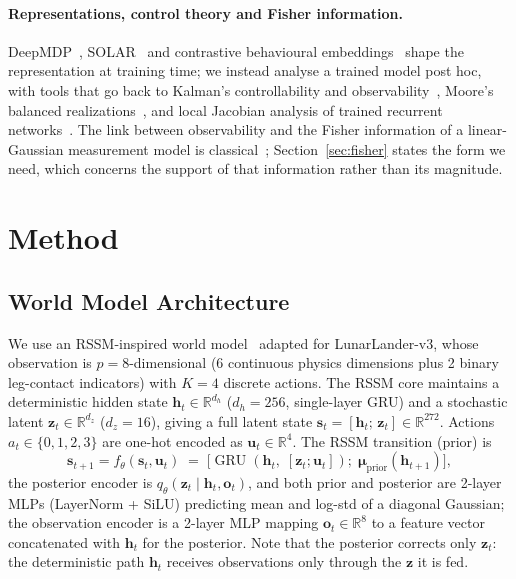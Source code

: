 \documentclass[11pt]{article}
\newcommand{\R}{\mathbb{R}}
\theoremstyle{remark}
\begin{document}
\paragraph{Representations, control theory and Fisher information.}
DeepMDP~\cite{gelada2019deepmdp}, SOLAR~\cite{zhang2019solar} and contrastive behavioural embeddings~\cite{agarwal2021contrastive} shape the representation at training time; we instead analyse a trained model post hoc, with tools that go back to Kalman's controllability and observability~\cite{kalman1963mathematical}, Moore's balanced realizations~\cite{moore1981principal}, and local Jacobian analysis of trained recurrent networks~\cite{sussillo2013opening}. The link between observability and the Fisher information of a linear-Gaussian measurement model is classical~\cite{kay1993fundamentals,anderson1979optimal}; Section~\ref{sec:fisher} states the form we need, which concerns the support of that information rather than its magnitude.

\section{Method}
\label{sec:method}

\subsection{World Model Architecture}
\label{sec:architecture}

We use an RSSM-inspired world model~\cite{hafner2020dreamer,hafner2023dreamerv3} adapted for LunarLander-v3, whose observation is $p{=}8$-dimensional (6 continuous physics dimensions plus 2 binary leg-contact indicators) with $K{=}4$ discrete actions. The RSSM core maintains a deterministic hidden state $\bm{h}_t \in \R^{d_h}$ ($d_h{=}256$, single-layer GRU) and a stochastic latent $\bm{z}_t \in \R^{d_z}$ ($d_z{=}16$), giving a full latent state $\bm{s}_t = [\bm{h}_t;\, \bm{z}_t] \in \R^{272}$. Actions $a_t \in \{0,1,2,3\}$ are one-hot encoded as $\bm{u}_t \in \R^4$. The RSSM transition (prior) is
\begin{equation}
  \bm{s}_{t+1} = f_\theta(\bm{s}_t, \bm{u}_t)
    \;=\;
    \bigl[\operatorname{GRU}(\bm{h}_t,\; [\bm{z}_t;\bm{u}_t]);\;
          \bm{\mu}_{\text{prior}}(\bm{h}_{t+1})\bigr],
  \label{eq:transition}
\end{equation}
the posterior encoder is $q_\theta(\bm{z}_t \mid \bm{h}_t, \bm{o}_t)$, and both prior and posterior are 2-layer MLPs (LayerNorm + SiLU) predicting mean and log-std of a diagonal Gaussian; the observation encoder is a 2-layer MLP mapping $\bm{o}_t \in \R^8$ to a feature vector concatenated with $\bm{h}_t$ for the posterior. Note that the posterior corrects only $\bm{z}_t$: the deterministic path $\bm{h}_t$ receives observations only through the $\bm{z}$ it is fed.
\end{document}

